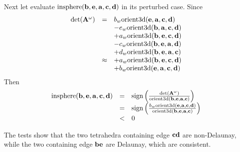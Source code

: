 Next let evaluate $\textrm{insphere}({\bf b},{\bf e},{\bf a},{\bf c},{\bf d})$ in its perturbed case. Since
\[
\begin{array}{rcl}
\textrm{det}({\bf A}^{\omega}) &=&
b_w\textrm{orient3d}({\bf e},{\bf a},{\bf c},{\bf d})\\
& & -e_w\textrm{orient3d}({\bf b},{\bf a},{\bf c},{\bf d})\\
& & +a_w\textrm{orient3d}({\bf b},{\bf e},{\bf c},{\bf d})\\
& & -c_w\textrm{orient3d}({\bf b},{\bf e},{\bf a},{\bf d})\\
& & +d_w\textrm{orient3d}({\bf b},{\bf e},{\bf a},{\bf c})\\
&\approx& +a_w\textrm{orient3d}({\bf b},{\bf e},{\bf c},{\bf d})\\
& & +b_w\textrm{orient3d}({\bf e},{\bf a},{\bf c},{\bf d})
\end{array}
\]
Then
\[
\begin{array}{rcl}
\textrm{insphere}({\bf b},{\bf e},{\bf a},{\bf c},{\bf d}) &=&
\textrm{sign}\left(\frac{\textrm{det}({\bf A}^{\omega})}{\textrm{orient3d}({\bf b},{\bf e},{\bf a},{\bf c})}\right)\\
&=& \textrm{sign}\left(\frac{b_w\textrm{orient3d}({\bf e},{\bf a},{\bf c},{\bf d})}{\textrm{orient3d}({\bf b},{\bf e},{\bf a},{\bf c})}\right)\\
&<& 0
\end{array}
\]

The tests show that the two tetrahedra containing edge ${\bf cd}$ are non-Delaunay, while the two containing edge ${\bf be}$ are Delaunay, which are consistent. 